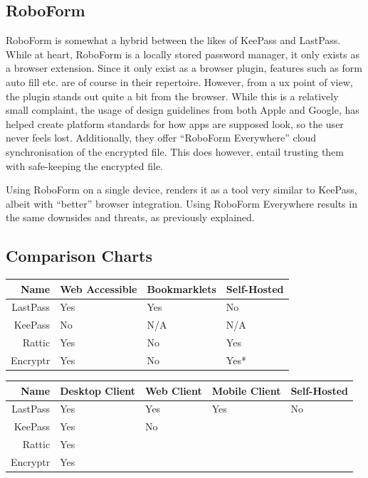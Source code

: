 		\subsection*{RoboForm}
			RoboForm\cite{roboform} is somewhat a hybrid between the likes of KeePass and LastPass. While at heart, RoboForm is a locally stored password manager, it only exists as a browser extension. Since it only exist as a browser plugin, features such as form auto fill etc. are of course in their repertoire. However, from a ux point of view, the plugin stands out quite a bit from the browser. While this is a relatively small complaint, the usage of design guidelines from both Apple and Google, has helped create platform standards for how apps are supposed look, so the user never feels lost. Additionally, they offer ``RoboForm Everywhere'' cloud synchronisation of the encrypted file. This does however, entail trusting them with safe-keeping the encrypted file.

			Using RoboForm on a single device, renders it as a tool very similar to KeePass, albeit with ``better'' browser integration. Using RoboForm Everywhere results in the same downsides and threats, as previously explained.

		\subsection*{Comparison Charts}


			\begin{tabular} {r l l l }
				Name 				& Web Accessible 	& Bookmarklets	& Self-Hosted 		\\
				\hline
				LastPass 			& \cellcolor{green!75}Yes	& \cellcolor{green!75}Yes	& \cellcolor{red!75} No		\\
				KeePass 			& \cellcolor{red!75}No 		& N/A 						& N/A						\\ 
				Rattic  			& \cellcolor{green!75}Yes 	& \cellcolor{red!75}No 		& \cellcolor{green!75} Yes	\\
				Encryptr 			& \cellcolor{green!75}Yes 	& \cellcolor{red!75}No 		& \cellcolor{green!75} Yes* \\
			\end{tabular}


			\begin{tabular}{ r l l l l }
					Name 				& Desktop Client 	& Web Client 	& Mobile Client 	& Self-Hosted	\\
					\hline
					LastPass 			& Yes 				& Yes			& Yes				& No \\
					KeePass 			& Yes				& No			& \\
					Rattic  			& Yes						& \\
					Encryptr 			& Yes					  	& \\
				\end{tabular}



